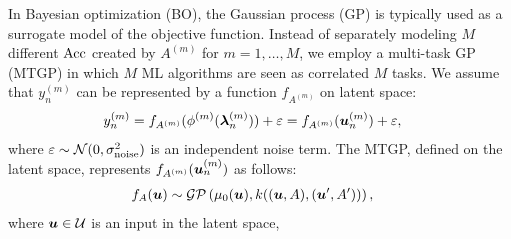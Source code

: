 In Bayesian optimization (BO), the Gaussian process (GP) \cite{rasmussen:williams:2006} is typically used as a surrogate model of the objective function. 
%
Instead of separately modeling $M$ different $\mathrm{Acc}$ created by $A^{(m)}$ for 
$m = 1, \ldots, M$, 
we employ a multi-task GP (MTGP) \cite{NIPS2007_66368270, alvarez2012kernels} in which $M$ ML algorithms are seen as correlated $M$ tasks. 
%
We assume that 
$y_n^{(m)}$
can be represented by a function $f_{A^{(m)}}$ on latent space:
\begin{align*}
 y_n^{(m)} 
 & = f_{A^{(m)}}(\phi^{(m)}(\boldsymbol{\lambda}_n^{(m)})) + \varepsilon
 = f_{A^{(m)}}(\boldsymbol{u}_n^{(m)}) + \varepsilon,
\end{align*}
%
where
$\varepsilon \sim {\mathcal N}(0, \sigma_{\rm noise}^2)$
is an independent noise term.
%
The MTGP, defined on the latent space, represents
$f_{A^{(m)}}(\boldsymbol{u}_n^{(m)})$
as follows:
\begin{align}
 f_{A}(\boldsymbol{u}) &\sim
 {\mathcal G}{\mathcal P} \left(\mu_0(\boldsymbol{u}), k((\boldsymbol{u},A), (\boldsymbol{u}^\prime, A^\prime))\right),
 \label{eq:MTGP}
\end{align}
where 
$\boldsymbol{u} \in {\mathcal U}$ is an input in the latent space,
